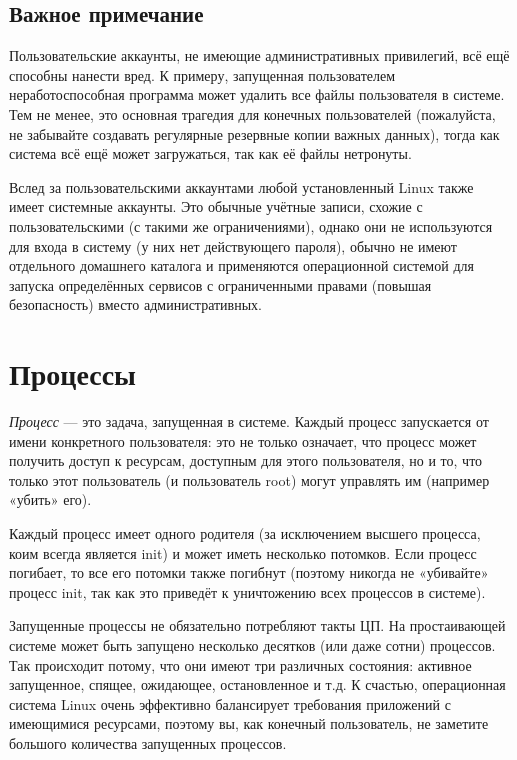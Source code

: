 \documentclass[10pt]{book}
\begin{document}
\subsection{Важное примечание}

Пользовательские аккаунты, не имеющие административных привилегий, всё ещё способны нанести вред. К примеру, запущенная пользователем неработоспособная программа может удалить все файлы пользователя в системе. Тем не менее, это основная трагедия для конечных пользователей (пожалуйста, не забывайте создавать регулярные резервные копии важных данных), тогда как система всё ещё может загружаться, так как её файлы нетронуты. 

Вслед за пользовательскими аккаунтами любой установленный Linux также имеет системные аккаунты. Это обычные учётные записи, схожие с пользовательскими (с такими же ограничениями), однако они не используются для входа в систему (у них нет действующего пароля), обычно не имеют отдельного домашнего каталога и применяются операционной системой для запуска определённых сервисов с ограниченными правами (повышая безопасность) вместо административных. 

\section{Процессы}

\emph{Процесс} — это задача, запущенная в системе. Каждый процесс запускается от имени конкретного пользователя: это не только означает, что процесс может получить доступ к ресурсам, доступным для этого пользователя, но и то, что только этот пользователь (и пользователь root) могут управлять им (например «убить» его).

Каждый процесс имеет одного родителя (за исключением высшего процесса, коим всегда является init) и может иметь несколько потомков. Если процесс погибает, то все его потомки также погибнут (поэтому никогда не «убивайте» процесс init, так как это приведёт  к уничтожению всех процессов в системе).

Запущенные процессы не обязательно потребляют такты ЦП. На простаивающей системе может быть запущено несколько десятков (или даже сотни) процессов. Так происходит потому, что они имеют три различных состояния: активное запущенное, спящее, ожидающее, остановленное и т.д. К счастью, операционная система Linux очень эффективно балансирует требования приложений с имеющимися ресурсами, поэтому вы, как конечный пользователь, не заметите большого количества запущенных процессов. 
\end{document}
